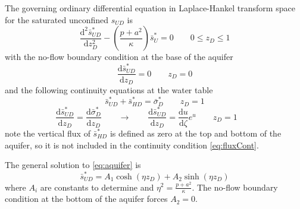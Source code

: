 \documentclass[12pt,letterpaper]{article}
\begin{document}
The governing ordinary differential equation in Laplace-Hankel
transform space for the saturated unconfined $s_{UD}$ is
\begin{equation}
  \label{eq:aquifer}
  \frac{\mathrm{d}^2 \bar{s}_{UD}^{\ast}}{\mathrm{d} z_D^2} - \left( \frac{p + a^2}{\kappa} \right)\bar{s}_U^{\ast} = 0 \qquad 0 \le z_D \le 1
\end{equation}
with the no-flow boundary condition at the base of the aquifer
\begin{equation}\nonumber
 \frac{\mathrm{d} \bar{s}_{UD}^{\ast}}{\mathrm{d} z_D} = 0 \qquad z_D=0 
\end{equation}
and the following continuity equations at the water table
\begin{equation}
  \label{eq:headCont}
  \bar{s}_{UD}^{\ast} + \bar{s}_{HD}^{\ast} = \bar{\sigma}_D^{\ast} \qquad z_D=1
\end{equation}
\begin{equation}
  \label{eq:fluxCont}
  \frac{\mathrm{d} \bar{s}_{UD}^{\ast}}{\mathrm{d} z_D}  = \frac{\mathrm{d}
    \bar{\sigma}_D^{\ast}}{\mathrm{d} z_D} \qquad \rightarrow \qquad \frac{\mathrm{d} \bar{s}_{UD}^{\ast}}{\mathrm{d} z_D}  = \frac{\mathrm{d}u}{\mathrm{d} \zeta} e^u \qquad z_D=1
  \qquad 
\end{equation}
note the vertical flux of $\bar{s}_{HD}^{\ast}$ is defined as zero at
the top and bottom of the aquifer, so it is not included in the
continuity condition \eqref{eq:fluxCont}.

The general solution to \eqref{eq:aquifer} is 
\begin{equation}
  \label{eq:su}
  \bar{s}_{UD}^{\ast} = A_1 \cosh(\eta z_D) + A_2 \sinh(\eta z_D)
\end{equation}
where $A_i$ are constants to determine and $\eta^2 = \frac{p + a^2}{\kappa}$.  The no-flow boundary condition at the bottom of the aquifer forces $A_2=0$.  
\end{document}
